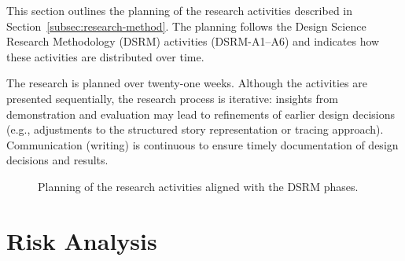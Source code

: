 \documentclass{ou-report-vaf}
\begin{document}
This section outlines the planning of the research activities described in Section~\ref{subsec:research-method}. The planning follows the Design Science Research Methodology (DSRM) activities (DSRM-A1--A6) and indicates how these activities are distributed over time.

The research is planned over twenty-one weeks. Although the activities are presented sequentially, the research process is iterative: insights from demonstration and evaluation may lead to refinements of earlier design decisions (e.g., adjustments to the structured story representation or tracing approach). Communication (writing) is continuous to ensure timely documentation of design decisions and results.

\begin{figure}[h!tb]
    \centering
    \caption{Planning of the research activities aligned with the DSRM phases.}
    \label{fig:planning-gantt}
\end{figure}

\clearpage
\section{Risk Analysis}
\label{sec:risk-analysis}
\end{document}
